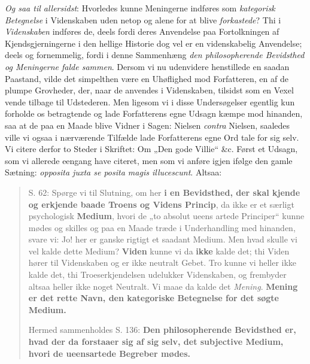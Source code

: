 \documentclass[12pt,a4paper]{book}
\newcommand{\opage}[1]{\marginnote{\footnotesize\textit{[#1]}}}
\begin{document}
\emph{Og saa til allersidst}: Hvorledes kunne Meningerne
indføres som \emph{kategorisk Betegnelse} i Videnskaben
uden netop og alene for at blive \emph{forkastede}? Thi i
\emph{Videnskaben} indføres de, deels fordi deres Anvendelse
paa Fortolkningen af Kjendsgjerningerne i den hellige
Historie dog vel er en videnskabelig Anvendelse;
deels og fornemmelig, fordi i denne Sammenhæng \emph{den
philosopherende Bevidsthed og Meningerne
falde sammen}. Dersom vi nu udenvidere henstillede en
saadan Paastand, vilde det simpelthen være en Uhøflighed
mod Forfatteren, en af de plumpe Grovheder, der, naar
de anvendes i Videnskaben, tilsidst som en Vexel vende
tilbage til Udstederen. Men ligesom vi i disse Undersøgelser
egentlig kun forholde os betragtende og lade
Forfatterens egne Udsagn kæmpe mod hinanden, saa at
de paa en Maade blive Vidner i Sagen: Nielsen \textit{contra}
Nielsen, saaledes ville vi ogsaa i nærværende Tilfælde
lade Forfatterens egne Ord tale for sig selv. Vi citere
derfor to Steder i Skriftet: Om „Den gode Villie“ \&c. Først
et Udsagn, som vi allerede eengang have citeret, men som
vi anføre igjen ifølge den gamle Sætning: \textit{opposita
juxta se posita magis illucescunt}. Altsaa:
\begin{quote}
S. 62: Spørge vi til Slutning, om her \textbf{i en
Bevidsthed, der skal kjende og erkjende baade
Troens og Videns Princip}, da ikke er et særligt
psychologisk \textbf{Medium}, hvori de „to absolut ueens%
\opage{80}\setcounter{footnote}{0}%
artede Principer“ kunne mødes og skilles og paa en
Maade træde i Underhandling med hinanden, svare
vi: Jo! her er ganske rigtigt et saadant Medium.
Men hvad skulle vi vel kalde dette Medium? \textbf{Viden}
kunne vi da \textbf{ikke} kalde det; thi Viden hører til Videnskaben
og er ikke neutralt Gebet. Tro kunne vi
heller ikke kalde det, thi Troeserkjendelsen udelukker
Videnskaben, og frembyder altsaa heller ikke noget
Neutralt. Vi maae da kalde det \emph{Mening}. \textbf{Mening
er det rette Navn, den kategoriske Betegnelse
for det søgte Medium.}

Hermed sammenholdes S. 136: \textbf{Den philosopherende
Bevidsthed er, hvad der da forstaaer
sig af sig selv, det subjective Medium, hvori
de ueensartede Begreber mødes.}
\end{quote}
\end{document}
